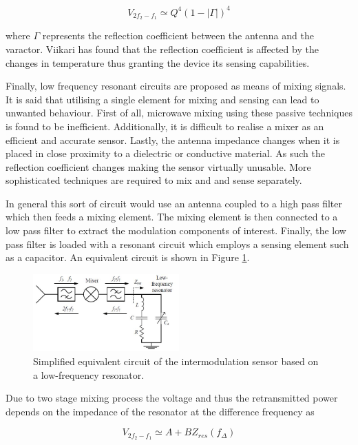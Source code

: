 \documentclass[11pt,a4paper]{article}
\begin{document}
\begin{equation}
V_{2f_2-f_1} \simeq Q^4(1 - |\Gamma|)^4
\end{equation}

where $\Gamma$ represents the reflection coefficient between the antenna and the varactor. Viikari has found that the reflection coefficient is affected by the changes in temperature thus granting the device its sensing capabilities.

Finally, low frequency resonant circuits are proposed as means of mixing signals. It is said that utilising a single element for mixing and sensing can lead to unwanted behaviour. First of all, microwave mixing using these passive techniques is found to be inefficient. Additionally, it is difficult to realise a mixer as an efficient and accurate sensor. Lastly, the antenna impedance changes when it is placed in close proximity to a dielectric or conductive material. As such the reflection coefficient changes making the sensor virtually unusable. More sophisticated techniques are required to mix and and sense separately.

In general this sort of circuit would use an antenna coupled to a high pass filter which then feeds a mixing element. The mixing element is then connected to a low pass filter to extract the modulation components of interest. Finally, the low pass filter is loaded with a resonant circuit which employs a sensing element such as a capacitor. An equivalent circuit is shown in Figure \ref{fig:lowf}.

\begin{figure}[h]
\centering
\includegraphics[width=0.5\textwidth]{low_f.JPG}
\caption{Simplified equivalent circuit of the intermodulation sensor based on a low-frequency resonator. \cite{rfidMEMS}\label{fig:lowf}}
\end{figure}

Due to two stage mixing process the voltage and thus the retransmitted power depends on the impedance of the resonator at the difference frequency as

\begin{equation}
V_{2f_2-f_1} \simeq A + BZ_{res}(f_{\Delta})
\end{equation}
\end{document}
